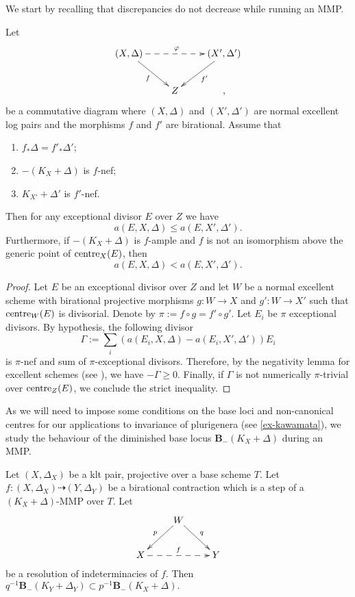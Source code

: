 \documentclass[a4paper,12pt]{book}
\newcommand{\cent}{\textup{centre}}
\begin{document}
	We start by recalling that discrepancies do not decrease while running an MMP.
		\begin{lemma}\label{l:increase-discr}
		Let 
		\[
		\xymatrix{
			(X,\Delta) \ar[dr]_{f}   \ar@{-->}[rr]^{\varphi} &  &  (X', \Delta') \ar[dl]^{f'}  \\
			&Z & ,
		}
		\]
		be a commutative diagram  where $(X,\Delta)$ and $(X', \Delta')$ are normal excellent log pairs and the morphisms $f$ and $f'$ are birational.
		Assume that
		\begin{enumerate}
			\item $f_*\Delta=f'_*\Delta'$;
			\item $-(K_X+\Delta)$ is $f$-nef;
			\item $K_{X'}+\Delta'$ is $f'$-nef. 
		\end{enumerate}
		Then for any exceptional divisor $E$ over $Z$ we have $$a(E, X, \Delta ) \leq a(E, X', \Delta').$$
		Furthermore, if $-(K_X+\Delta)$ is $f$-ample and $f$ is not an isomorphism above the generic point of $\cent_X(E)$, then
		$$ a(E, X, \Delta ) < a(E, X', \Delta').$$
	\end{lemma}
	\begin{proof}
		Let $E$ be an exceptional divisor over $Z$ and let $W$ be a normal excellent scheme with birational projective morphisms $g \colon W \to X$ and $g' \colon W \to X'$ such that $\textup{centre}_W(E)$ is divisorial. Denote by $\pi:= f \circ g=f' \circ g'$. Let $E_{i}$ be $\pi$ exceptional divisors. By hypothesis, the following divisor
		$$\Gamma:= \sum_i \left( a(E_i, X, \Delta)-a(E_i, X', \Delta') \right)E_i $$ 
		is $\pi$-nef and sum of $\pi$-exceptional divisors.
		Therefore, by the negativity lemma for excellent schemes (see \cite[Lemma 2.14]{bhatt2020}), we have $-\Gamma\geq 0$. Finally, if $\Gamma$ is not numerically $\pi$-trivial over $\cent_Z(E)$, we conclude the strict inequality.
	\end{proof}
	
	As we will need to impose some conditions on the base loci and non-canonical centres for our applications to invariance of plurigenera (see \autoref{ex-kawamata}), we study the behaviour of the diminished base locus $\mathbf{B}_{-}(K_X+\Delta)$ during an MMP.
	
	
	\begin{lemma}\label{l-stable-base-loci}
		Let $(X,\Delta_X)$ be a klt pair, projective over a base scheme $T$.
		Let $f\colon (X, \Delta_X) \dashrightarrow (Y, \Delta_Y)$ be a birational contraction which is a step of a  $(K_X+\Delta)$-MMP over $T$.
		Let
		\begin{equation*}
			\xymatrix{
				& W \ar[dr]^q \ar[dl]_p & \\
				X \ar@{-->}[rr]^{f} & & Y}
		\end{equation*} 
		be a resolution of indeterminacies of $f$.
		Then $q^{-1}\mathbf{B}_{-}(K_Y+\Delta_Y) \subset p^{-1}\mathbf{B}_{-}(K_X+\Delta).$
	\end{lemma}
	
\end{document}
